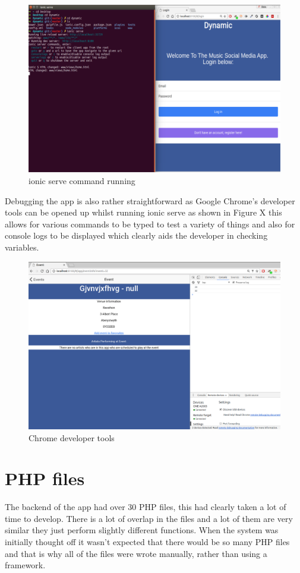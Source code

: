 \begin{figure}[H]
\includegraphics[scale=0.45]{images/chrome}
\caption{ionic serve command running}
\end{figure}

Debugging the app is also rather straightforward as Google Chrome's developer tools can be opened up whilst running ionic serve as shown in Figure X this allows for various commands to be typed to test a variety of things and also for console logs to be displayed which clearly aids the developer in checking variables.

\begin{figure}[H]
\includegraphics[scale=0.45]{images/chrome2}
\caption{Chrome developer tools}
\end{figure}

\section{PHP files}
The backend of the app had over 30 PHP files, this had clearly taken a lot of time to develop. There is a lot of overlap in the files and a lot of them are very similar they just perform slightly different functions. When the system was initially thought off it wasn't expected that there would be so many PHP files and that is why all of the files were wrote manually, rather than using a framework. 

